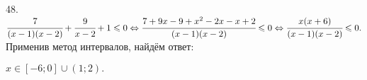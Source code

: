 48. $\cfrac{7}{(x-1)(x-2)}+\cfrac{9}{x-2}+1\leqslant0\Leftrightarrow \cfrac{7+9x-9+x^2-2x-x+2}{(x-1)(x-2)}\leqslant0
\Leftrightarrow \cfrac{x(x+6)}{(x-1)(x-2)}\leqslant0.$ Применив метод интервалов, найдём ответ:
\begin{figure}[ht!]
\end{figure}
$x\in[-6;0]\cup(1;2).$\newpage\noindent
